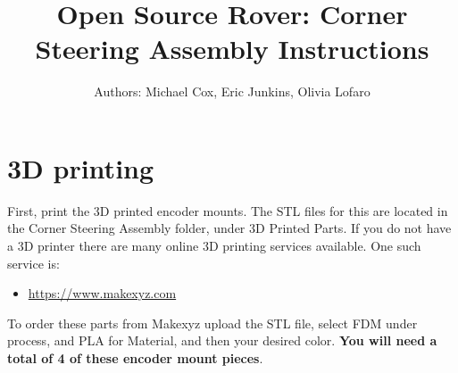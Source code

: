 \documentclass[12pt]{article}
\begin{document}
\newcommand\partimg{\includegraphics[width=2cm,height=1.25cm,keepaspectratio]}


\title{Open Source Rover: Corner Steering Assembly Instructions}
\author{Authors: Michael Cox, Eric Junkins, Olivia Lofaro}

\makeatletter
\def\@maketitle{
\begin{center}
	\makebox[\textwidth][c]{ \texttt{[image: "Pictures/Corner Title".png]}}
	{\Huge \bfseries \sffamily \@title }\\[3ex]
	{\Large \sffamily \@author}\\[3ex]
	\texttt{[image: "Pictures/JPL logo".png]}
\end{center}}
\makeatother

\maketitle



\newpage

\tableofcontents


\section{3D printing}
First, print the 3D printed encoder mounts. The STL files for this are located in the Corner Steering Assembly folder, under 3D Printed Parts. If you do not have a 3D printer there are many online 3D printing services available. One such service is:

\begin{itemize}
	\item \href{https://www.makexyz.com}{https://www.makexyz.com}
\end{itemize}

To order these parts from Makexyz upload the STL file, select FDM under process, and PLA for Material, and then your desired color. \textbf{You will need a total of 4 of these encoder mount pieces}.
\end{document}
